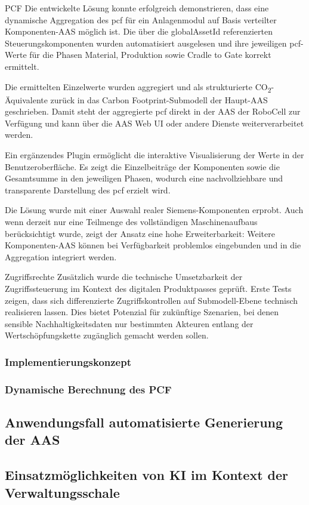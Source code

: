 PCF
Die entwickelte Lösung konnte erfolgreich demonstrieren, dass eine dynamische Aggregation des \acs{pcf} für ein Anlagenmodul auf Basis verteilter Komponenten-AAS möglich ist. Die über die globalAssetId referenzierten Steuerungskomponenten wurden automatisiert ausgelesen und ihre jeweiligen \acs{pcf}-Werte für die Phasen Material, Produktion sowie Cradle to Gate korrekt ermittelt.

Die ermittelten Einzelwerte wurden aggregiert und als strukturierte CO\textsubscript{2}-Äquivalente zurück in das Carbon Footprint-Submodell der Haupt-AAS geschrieben. Damit steht der aggregierte \acs{pcf} direkt in der AAS der RoboCell zur Verfügung und kann über die AAS Web UI oder andere Dienste weiterverarbeitet werden.

Ein ergänzendes Plugin ermöglicht die interaktive Visualisierung der Werte in der Benutzeroberfläche. Es zeigt die Einzelbeiträge der Komponenten sowie die Gesamtsumme in den jeweiligen Phasen, wodurch eine nachvollziehbare und transparente Darstellung des \acs{pcf} erzielt wird.

Die Lösung wurde mit einer Auswahl realer Siemens-Komponenten erprobt. Auch wenn derzeit nur eine Teilmenge des vollständigen Maschinenaufbaus berücksichtigt wurde, zeigt der Ansatz eine hohe Erweiterbarkeit: Weitere Komponenten-AAS können bei Verfügbarkeit problemlos eingebunden und in die Aggregation integriert werden.

Zugriffsrechte
Zusätzlich wurde die technische Umsetzbarkeit der Zugriffssteuerung im Kontext des digitalen Produktpasses geprüft. Erste Tests zeigen, dass sich differenzierte Zugriffskontrollen auf Submodell-Ebene technisch realisieren lassen. Dies bietet Potenzial für zukünftige Szenarien, bei denen sensible Nachhaltigkeitsdaten nur bestimmten Akteuren entlang der Wertschöpfungskette zugänglich gemacht werden sollen.
\subsubsection{Implementierungskonzept}
\subsubsection{Dynamische Berechnung des PCF}
\subsection{Anwendungsfall automatisierte Generierung der AAS}
\subsection{Einsatzmöglichkeiten von KI im Kontext der Verwaltungsschale}
